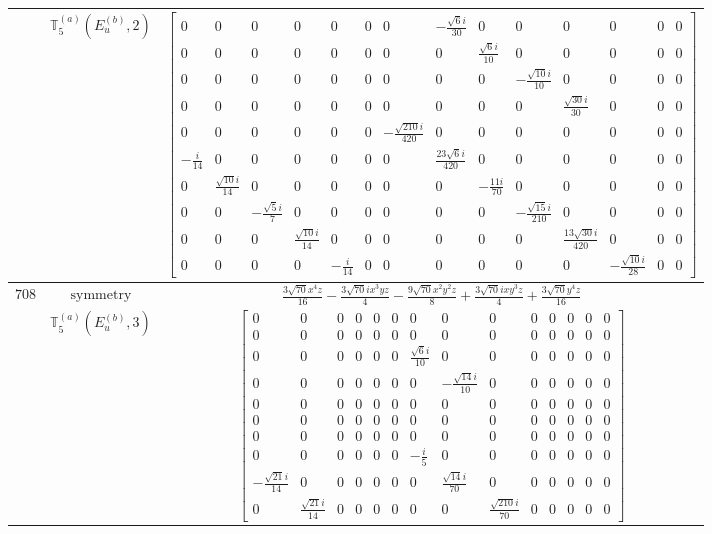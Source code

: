 \documentclass[fleqn,8pt,landscape]{jsarticle}
\begin{document}
\begin{longtable}{ccc}
$  $ & $ \mathbb{T}_{5}^{(a)}(E_{u}^{(b)},2) $ & $ \begin{bmatrix} 0 & 0 & 0 & 0 & 0 & 0 & 0 & - \frac{\sqrt{6} i}{30} & 0 & 0 & 0 & 0 & 0 & 0 \\ 0 & 0 & 0 & 0 & 0 & 0 & 0 & 0 & \frac{\sqrt{6} i}{10} & 0 & 0 & 0 & 0 & 0 \\ 0 & 0 & 0 & 0 & 0 & 0 & 0 & 0 & 0 & - \frac{\sqrt{10} i}{10} & 0 & 0 & 0 & 0 \\ 0 & 0 & 0 & 0 & 0 & 0 & 0 & 0 & 0 & 0 & \frac{\sqrt{30} i}{30} & 0 & 0 & 0 \\ 0 & 0 & 0 & 0 & 0 & 0 & - \frac{\sqrt{210} i}{420} & 0 & 0 & 0 & 0 & 0 & 0 & 0 \\ - \frac{i}{14} & 0 & 0 & 0 & 0 & 0 & 0 & \frac{23 \sqrt{6} i}{420} & 0 & 0 & 0 & 0 & 0 & 0 \\ 0 & \frac{\sqrt{10} i}{14} & 0 & 0 & 0 & 0 & 0 & 0 & - \frac{11 i}{70} & 0 & 0 & 0 & 0 & 0 \\ 0 & 0 & - \frac{\sqrt{5} i}{7} & 0 & 0 & 0 & 0 & 0 & 0 & - \frac{\sqrt{15} i}{210} & 0 & 0 & 0 & 0 \\ 0 & 0 & 0 & \frac{\sqrt{10} i}{14} & 0 & 0 & 0 & 0 & 0 & 0 & \frac{13 \sqrt{30} i}{420} & 0 & 0 & 0 \\ 0 & 0 & 0 & 0 & - \frac{i}{14} & 0 & 0 & 0 & 0 & 0 & 0 & - \frac{\sqrt{10} i}{28} & 0 & 0 \end{bmatrix} $ \\ \hline
$ 708 $ & $ \text{symmetry} $ & $ \frac{3 \sqrt{70} x^{4} z}{16} - \frac{3 \sqrt{70} i x^{3} y z}{4} - \frac{9 \sqrt{70} x^{2} y^{2} z}{8} + \frac{3 \sqrt{70} i x y^{3} z}{4} + \frac{3 \sqrt{70} y^{4} z}{16} $ \\
$  $ & $ \mathbb{T}_{5}^{(a)}(E_{u}^{(b)},3) $ & $ \begin{bmatrix} 0 & 0 & 0 & 0 & 0 & 0 & 0 & 0 & 0 & 0 & 0 & 0 & 0 & 0 \\ 0 & 0 & 0 & 0 & 0 & 0 & 0 & 0 & 0 & 0 & 0 & 0 & 0 & 0 \\ 0 & 0 & 0 & 0 & 0 & 0 & \frac{\sqrt{6} i}{10} & 0 & 0 & 0 & 0 & 0 & 0 & 0 \\ 0 & 0 & 0 & 0 & 0 & 0 & 0 & - \frac{\sqrt{14} i}{10} & 0 & 0 & 0 & 0 & 0 & 0 \\ 0 & 0 & 0 & 0 & 0 & 0 & 0 & 0 & 0 & 0 & 0 & 0 & 0 & 0 \\ 0 & 0 & 0 & 0 & 0 & 0 & 0 & 0 & 0 & 0 & 0 & 0 & 0 & 0 \\ 0 & 0 & 0 & 0 & 0 & 0 & 0 & 0 & 0 & 0 & 0 & 0 & 0 & 0 \\ 0 & 0 & 0 & 0 & 0 & 0 & - \frac{i}{5} & 0 & 0 & 0 & 0 & 0 & 0 & 0 \\ - \frac{\sqrt{21} i}{14} & 0 & 0 & 0 & 0 & 0 & 0 & \frac{\sqrt{14} i}{70} & 0 & 0 & 0 & 0 & 0 & 0 \\ 0 & \frac{\sqrt{21} i}{14} & 0 & 0 & 0 & 0 & 0 & 0 & \frac{\sqrt{210} i}{70} & 0 & 0 & 0 & 0 & 0 \end{bmatrix} $ \\ \hline

\end{longtable}
\end{document}
